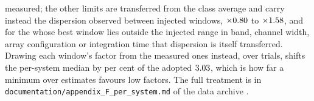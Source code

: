 measured; the other \SmcNEstSys{} limits are transferred from the class
average and carry instead
the dispersion observed between injected windows, $\times0.80$ to
$\times1.58$, and for the \NgNExtrapSys{} \NgExtrapSysNoun{} whose
best window lies outside the injected range in band, channel width, array
configuration or integration time that dispersion is itself transferred. Drawing each window's factor from the
\SensNInj{} measured ones instead, over \ScRsNTrial{} trials, shifts the
per-system median by \ScRsMedShiftPct{} per cent of the adopted
$3.03$, which is how far a minimum over estimates favours low
factors.
The full treatment is in \texttt{documentation/\allowbreak appendix\_F\_per\_system.md} of
the data archive \citep{SIdeposit}.

\begin{table}
\centering
\caption{\textbf{Per-system sensitivity of the carrier search.} For each of
the \NSysClassA{} systems the fine-channel search covers, the
$\mathrm{EIRP}_{90}$ of its best window with its own primary-beam,
annual-parallax and smearing retentions applied, ordered by the limit.
Columns, daggers and dashes are defined above.}
\label{tab:persys}
\footnotesize

\end{table}
